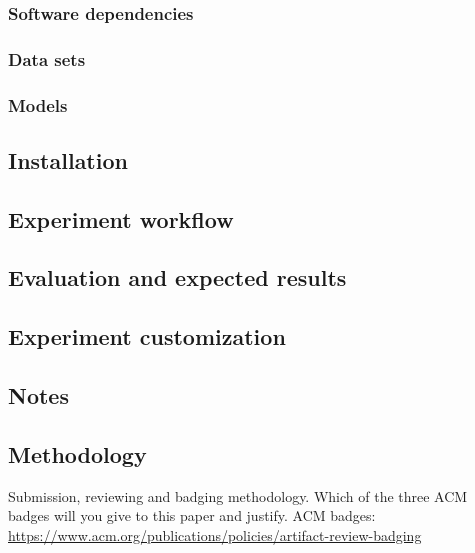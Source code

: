 \documentclass[sigconf,10pt, screen]{acmart}
\begin{document}
\subsubsection{Software dependencies}

\subsubsection{Data sets}

\subsubsection{Models}

\subsection{Installation}

\subsection{Experiment workflow}

\subsection{Evaluation and expected results}


\subsection{Experiment customization}

\subsection{Notes}

\subsection{Methodology}

Submission, reviewing and badging methodology. Which of the three ACM badges will you give to this paper and justify. ACM badges: \url{https://www.acm.org/publications/policies/artifact-review-badging}



\end{document}
